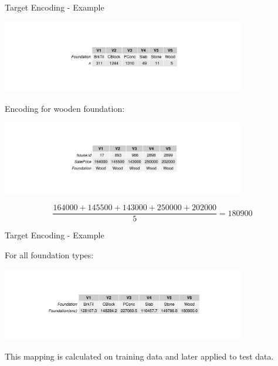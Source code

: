\begin{vbframe}{Target Encoding - Example}

\vfill

\begin{center}
\includegraphics[width = 0.8\textwidth]{figure/foundation_counts_table.pdf}
\end{center}

\vfill

Encoding for wooden foundation:

\vfill

\begin{center}
\includegraphics[width = 0.8\textwidth]{figure/wood_foundation_examples.pdf}
\end{center}

\vfill

$$\frac{164000 + 145500 + 143000 + 250000 + 202000}{5} = 180900$$

\end{vbframe}


\begin{vbframe}{Target Encoding - Example}

For all foundation types:

\vfill

\begin{center}
\includegraphics[width = 0.8\textwidth]{figure/foundation_encoding_table.pdf}
\end{center}

\vfill

This mapping is calculated on training data and later applied to test data.

\end{vbframe}

